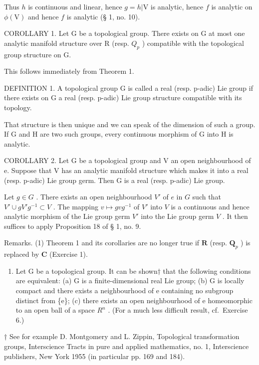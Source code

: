 Thus \(h\) is continuous and linear, hence \(g = h|\mathrm{V}\) is analytic, hence \(f\) is analytic on \(\phi(\mathrm{V})\) and hence \(f\) is analytic (§ 1, no. 10).

COROLLARY 1. Let G be a topological group. There exists on G at most one analytic manifold structure over R (resp. \(Q_{p}\) ) compatible with the topological group structure on G.

This follows immediately from Theorem 1.

DEFINITION 1. A topological group G is called a real (resp. p-adic) Lie group if there exists on G a real (resp. p-adic) Lie group structure compatible with its topology.

That structure is then unique and we can speak of the dimension of such a group. If G and H are two such groups, every continuous morphism of G into H is analytic.

COROLLARY 2. Let G be a topological group and V an open neighbourhood of e. Suppose that V has an analytic manifold structure which makes it into a real (resp. p-adic) Lie group germ. Then G is a real (resp. p-adic) Lie group.

Let \(g \in G\) . There exists an open neighbourhood \(V'\) of \(e\) in \(G\) such that \(V' \cup gV'g^{-1} \subset V\) . The mapping \(v \mapsto gvg^{-1}\) of \(V'\) into \(V\) is a continuous and hence analytic morphism of the Lie group germ \(V'\) into the Lie group germ \(V\) . It then suffices to apply Proposition 18 of § 1, no. 9.

Remarks. (1) Theorem 1 and its corollaries are no longer true if \(\mathbf{R}\) (resp. \(\mathbf{Q}_p\) ) is replaced by \(\mathbf{C}\) (Exercise 1).

\begin{enumerate}
\def\labelenumi{(\arabic{enumi})}
\setcounter{enumi}{1}
\tightlist
\item
  Let G be a topological group. It can be shown† that the following conditions are equivalent: (a) G is a finite-dimensional real Lie group; (b) G is locally compact and there exists a neighbourhood of e containing no subgroup distinct from \{e\}; (c) there exists an open neighbourhood of e homeomorphic to an open ball of a space \(R^{n}\) . (For a much less difficult result, cf.~Exercise 6.)
\end{enumerate}
† See for example D. Montgomery and L. Zippin, Topological transformation groups, Interscience Tracts in pure and applied mathematics, no. 1, Interscience publishers, New York 1955 (in particular pp. 169 and 184).

